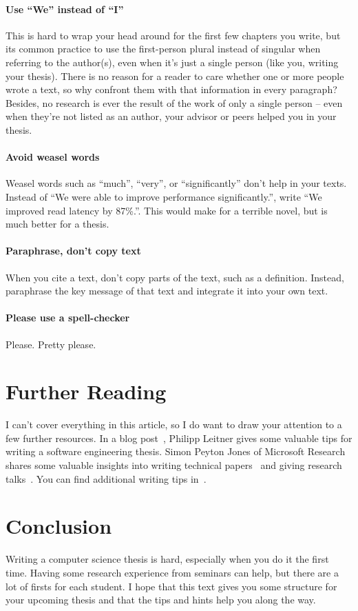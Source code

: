 \documentclass[a4]{article}
\begin{document}
\paragraph{Use ``We'' instead of ``I''}
This is hard to wrap your head around for the first few chapters you write, but its common practice to use the first-person plural instead of singular when referring to the author(s), even when it's just a single person (like you, writing your thesis).
There is no reason for a reader to care whether one or more people wrote a text, so why confront them with that information in every paragraph?
Besides, no research is ever the result of the work of only a single person -- even when they're not listed as an author, your advisor or peers helped you in your thesis.

\paragraph{Avoid weasel words}
Weasel words such as ``much'', ``very'', or ``significantly'' don't help in your texts.
Instead of ``We were able to improve performance significantly.'', write ``We improved read latency by 87\%.''.
This would make for a terrible novel, but is much better for a thesis.

\paragraph{Paraphrase, don't copy text}
When you cite a text, don't copy parts of the text, such as a definition.
Instead, paraphrase the key message of that text and integrate it into your own text.

\paragraph{Please use a spell-checker}
Please.
Pretty please.

\section{Further Reading}
\label{sec:resources}

I can't cover everything in this article, so I do want to draw your attention to a few further resources.
In a blog post~\cite{leitner}, Philipp Leitner gives some valuable tips for writing a software engineering thesis.
Simon Peyton Jones of Microsoft Research shares some valuable insights into writing technical papers~\cite{jones-paper} and giving research talks~\cite{jones-talk}.
You can find additional writing tips in~\cite{patterson-writing,ernst-writing,schulzrinne-writing}.

\section{Conclusion}
\label{sec:conclusion}

Writing a computer science thesis is hard, especially when you do it the first time.
Having some research experience from seminars can help, but there are a lot of firsts for each student.
I hope that this text gives you some structure for your upcoming thesis and that the tips and hints help you along the way.

\printbibliography
\end{document}
